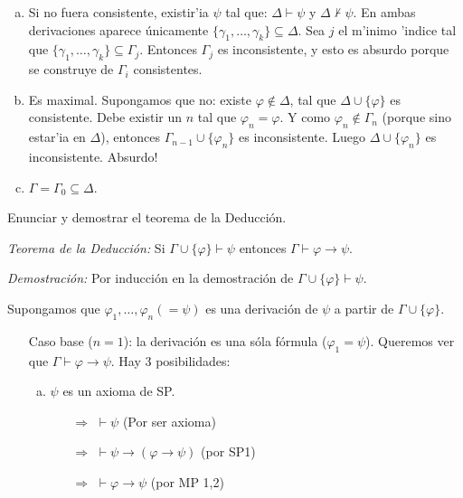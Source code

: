 \begin{questions}
\begin{solution}
\begin{enumerate}[(a)]
 \item Si no fuera consistente, existir'ia $\psi$ tal que: $\Delta \vdash \psi$ y $\Delta \nvdash \psi$. En ambas derivaciones aparece \'unicamente $\{ \gamma_1, \dots, \gamma_k \} \subseteq \Delta$. Sea $j$ el m'inimo 'indice tal que $\{ \gamma_1, \dots, \gamma_k \} \subseteq \Gamma_j$. Entonces $\Gamma_j$ es inconsistente, y esto es absurdo porque se construye de $\Gamma_i$ consistentes. 
 
 \item Es maximal. Supongamos que no: existe $\varphi \notin \Delta$, tal que $\Delta\cup\{\varphi\}$ es consistente. Debe existir un $n$ tal que $\varphi_n = \varphi$. Y como $\varphi_n \notin \Gamma_n$ (porque sino estar'ia en $\Delta$), entonces $\Gamma_{n-1} \cup \{ \varphi_n \}$ es inconsistente. Luego $\Delta \cup \{ \varphi_n \}$ es inconsistente. Absurdo! 
 
 \item $\Gamma = \Gamma_0 \subseteq \Delta$.
\end{enumerate}

\end{solution}

\question Enunciar y demostrar el teorema de la Deducci\'on. 


\begin{solution}

 {\it Teorema de la Deducci\'on: } Si $\Gamma\cup\{\varphi\}\vdash\psi$ entonces $\Gamma \vdash \varphi\rightarrow\psi$.
  
 {\it Demostraci\'on: } Por inducci\'on en la demostraci\'on de $\Gamma\cup\{\varphi\}\vdash\psi$.
 
 Supongamos que $\varphi_1, \dots, \varphi_n(=\psi)$ es una derivaci\'on de $\psi$ a partir de $\Gamma\cup\{\varphi\}$.
 
 \begin{itemize}[\quad]
  \item[Caso base ($n=1$):] la derivaci\'on es una s\'ola f\'ormula ($\varphi_1=\psi$). Queremos ver que $\Gamma\vdash\varphi\rightarrow\psi$. Hay 3 posibilidades: 
  \begin{enumerate}[a)]
   \item $\psi$ es un axioma de SP. 
    \begin{enumerate}
      \item[$\Rightarrow$] $\vdash\psi$ \hfill (Por ser axioma) 
      \item[$\Rightarrow$] $\vdash\psi\rightarrow(\varphi\rightarrow\psi)$ \hfill (por SP1)
      \item[$\Rightarrow$] $\vdash\varphi\rightarrow\psi$ \hfill (por MP 1,2) 
    \end{enumerate}
    

\end{enumerate}
\end{itemize}
\end{solution}
\end{questions}
